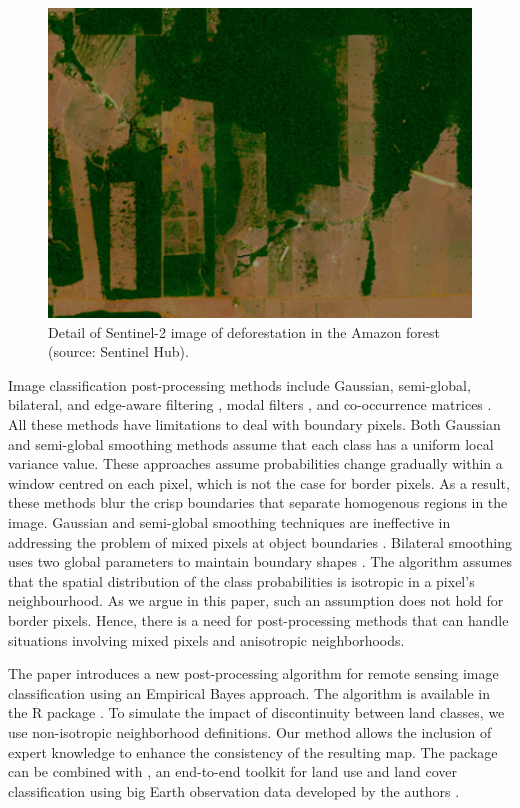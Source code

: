 \documentclass[
  shortnames]{jss}
\begin{document}
\begin{CodeChunk}
\begin{figure}[h]

{\centering \includegraphics[width=0.7\linewidth]{images/rondonia_3} 

}

\caption[Detail of Sentinel-2 image of deforestation in the Amazon forest (source]{Detail of Sentinel-2 image of deforestation in the Amazon forest (source: Sentinel Hub).}\label{fig:roim}
\end{figure}
\end{CodeChunk}

Image classification post-processing methods include Gaussian, semi-global, bilateral, and edge-aware filtering \citep{Schindler2012}, modal filters \citep{Ghimire2010}, and co-occurrence matrices \citep{Huang2014}. All these methods have limitations to deal with boundary pixels. Both Gaussian and semi-global smoothing methods assume that each class has a uniform local variance value. These approaches assume probabilities change gradually within a window centred on each pixel, which is not the case for border pixels. As a result, these methods blur the crisp boundaries that separate homogenous regions in the image. Gaussian and semi-global smoothing techniques are ineffective in addressing the problem of mixed pixels at object boundaries \citep{Huang2014}. Bilateral smoothing uses two global parameters to maintain boundary shapes \citep{Schindler2012}. The algorithm assumes that the spatial distribution of the class probabilities is isotropic in a pixel's neighbourhood. As we argue in this paper, such an assumption does not hold for border pixels. Hence, there is a need for post-processing methods that can handle situations involving mixed pixels and anisotropic neighborhoods.

The paper introduces a new post-processing algorithm for remote sensing image classification using an Empirical Bayes approach. The algorithm is available in the R package . To simulate the impact of discontinuity between land classes, we use non-isotropic neighborhood definitions. Our method allows the inclusion of expert knowledge to enhance the consistency of the resulting map. The  package can be combined with , an end-to-end toolkit for land use and land cover classification using big Earth observation data developed by the authors \citep{Simoes2021}.
\end{document}
